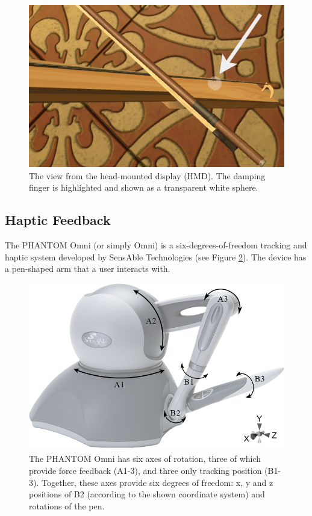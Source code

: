 \begin{figure}[ht]\includegraphics[width=\paperFigWidth\textwidth]{figures/vrView.jpg}
\centering
    \caption{The view from the head-mounted display (HMD). The damping finger is highlighted and shown as a transparent white sphere. \label{fig:vrView}}
\end{figure}

\subsection{Haptic Feedback}
The PHANTOM Omni (or simply Omni) is a six-degrees-of-freedom tracking and haptic system developed by SensAble Technologies (see Figure \ref{fig:omni}). The device has a pen-shaped arm that a user interacts with.  

\begin{figure}[t]\includegraphics[width=\paperFigWidth\textwidth]{figures/omniSchematic.png}
\centering
    \caption{The PHANTOM Omni has six axes of rotation, three of which provide force feedback (A1-3), and three only tracking position (B1-3). Together, these axes provide six degrees of freedom: x, y and z positions of B2 (according to the shown coordinate system) and rotations of the pen. \label{fig:omni}}
\end{figure}

